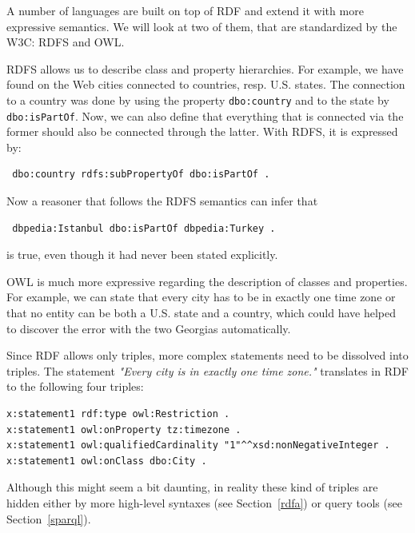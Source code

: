 A number of languages are built on top of \ac{RDF} and extend it with more expressive semantics.
We will look at two of them, that are standardized by the W3C: RDFS and OWL. %

RDFS allows us to describe class and property hierarchies.
For example, we have found on the Web cities connected to countries, resp. U.S. states.
The connection to a country was done by using the property \texttt{dbo:country} and to the state by \texttt{dbo:isPartOf}.
Now, we can also define that everything that is connected via the former should also be connected through the latter.
With RDFS, it is expressed by:

\begin{verbatim}
 dbo:country rdfs:subPropertyOf dbo:isPartOf .
\end{verbatim}

Now a reasoner that follows the RDFS semantics can infer that

\begin{verbatim}
 dbpedia:Istanbul dbo:isPartOf dbpedia:Turkey .
\end{verbatim}

is true, even though it had never been stated explicitly.

OWL is much more expressive regarding the description of classes and properties.
For example, we can state that every city has to be in exactly one time zone or that no entity can be both a U.S. state and a country, which could have helped to discover the error with the two Georgias automatically.

Since \ac{RDF} allows only triples, more complex statements need to be dissolved into triples.
The statement \textit{"Every city is in exactly one time zone."} translates in \ac{RDF} to the following four triples:

\begin{verbatim}
x:statement1 rdf:type owl:Restriction .
x:statement1 owl:onProperty tz:timezone .
x:statement1 owl:qualifiedCardinality "1"^^xsd:nonNegativeInteger .
x:statement1 owl:onClass dbo:City .
\end{verbatim}

Although this might seem a bit daunting, in reality these kind of triples are hidden either by more high-level syntaxes (see Section~\ref{rdfa}) or query tools (see Section~\ref{sparql}).

%

